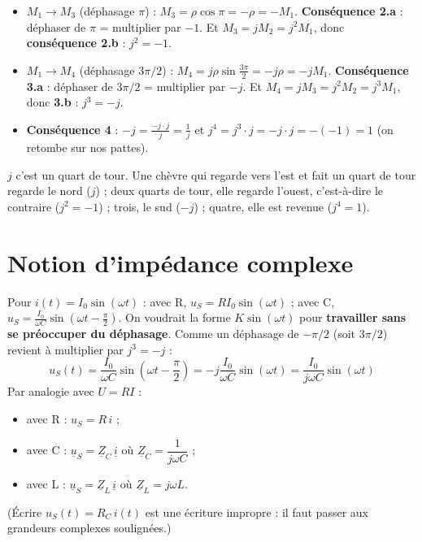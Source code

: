 \begin{thmbox}[title=Les puissances de $j$]
\begin{itemize}
  \item $M_1 \to M_3$ (déphasage $\pi$) : $M_3 = \rho\cos\pi = -\rho = -M_1$.
        \textbf{Conséquence 2.a} : déphaser de $\pi$ = multiplier par $-1$. Et
        $M_3 = jM_2 = j^2 M_1$, donc \textbf{conséquence 2.b} : $\boxed{j^2 = -1}$.
  \item $M_1 \to M_4$ (déphasage $3\pi/2$) : $M_4 = j\rho\sin\frac{3\pi}2 = -j\rho = -jM_1$.
        \textbf{Conséquence 3.a} : déphaser de $3\pi/2$ = multiplier par $-j$. Et
        $M_4 = jM_3 = j^2M_2 = j^3M_1$, donc \textbf{3.b} : $\boxed{j^3 = -j}$.
  \item \textbf{Conséquence 4} : $-j = \frac{-j\cdot j}{j} = \frac1j$ et
        $j^4 = j^3\cdot j = -j\cdot j = -(-1) = 1$ (on retombe sur nos pattes).
\end{itemize}
\end{thmbox}

\begin{goatbox}
$j$ c'est un quart de tour. Une chèvre qui regarde vers l'est et fait un quart de tour
regarde le nord ($j$) ; deux quarts de tour, elle regarde l'ouest, c'est-à-dire
\og le contraire\fg{} ($j^2 = -1$) ; trois, le sud ($-j$) ; quatre, elle est revenue ($j^4 = 1$).
\end{goatbox}

\section{Notion d'impédance complexe}


\begin{thmbox}[title=Impédance complexe]
Pour $i(t) = I_0\sin(\omega t)$ : avec R, $u_S = R I_0\sin(\omega t)$ ; avec C,
$u_S = \frac{I_0}{\omega C}\sin(\omega t - \frac\pi2)$. On voudrait la forme
$K\sin(\omega t)$ pour \textbf{travailler sans se préoccuper du déphasage}. Comme un déphasage
de $-\pi/2$ (soit $3\pi/2$) revient à multiplier par $j^3 = -j$ :
\[ u_S(t) = \frac{I_0}{\omega C}\sin\!\left(\omega t - \frac\pi2\right)
   = -j\frac{I_0}{\omega C}\sin(\omega t) = \frac{I_0}{j\omega C}\sin(\omega t) \]
Par analogie avec $U = RI$ :
\begin{itemize}
  \item avec R : $u_S = R\,i$ ;
  \item avec C : $\underline{u}_S = \underline Z_C\,\underline i$ où
        $\boxed{\underline Z_C = \dfrac1{j\omega C}}$ ;
  \item avec L : $\underline{u}_S = \underline Z_L\,\underline i$ où
        $\boxed{\underline Z_L = j\omega L}$.
\end{itemize}
(Écrire $u_S(t) = R_C\,i(t)$ est une \og écriture impropre\fg{} : il faut passer aux
grandeurs complexes soulignées.)
\end{thmbox}

